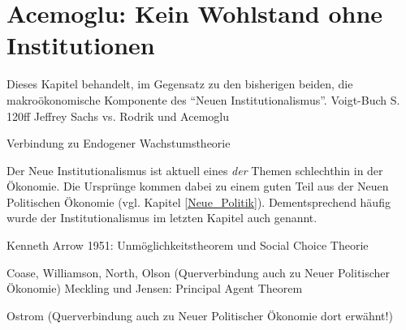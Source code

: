 \section{Acemoglu: Kein Wohlstand ohne Institutionen}

Dieses Kapitel behandelt, im Gegensatz zu den bisherigen beiden, die makroökonomische Komponente des "`Neuen Institutionalismus"'. 
Voigt-Buch S. 120ff
Jeffrey Sachs vs. Rodrik und Acemoglu



Verbindung zu Endogener Wachstumstheorie \textcite[S. 633ff]{Snowdon2005}

Der Neue Institutionalismus ist aktuell eines \textit{der} Themen schlechthin in der Ökonomie. Die Ursprünge kommen dabei zu einem guten Teil aus der Neuen Politischen Ökonomie (vgl. Kapitel \ref{Neue_Politik}). Dementsprechend häufig wurde der Institutionalismus im letzten Kapitel auch genannt.





Kenneth Arrow 1951: Unmöglichkeitstheorem und Social Choice Theorie




Coase, Williamson, North, Olson (Querverbindung auch zu Neuer Politischer Ökonomie)
Meckling und Jensen: Principal Agent Theorem



Ostrom (Querverbindung auch zu Neuer Politischer Ökonomie dort erwähnt!)



